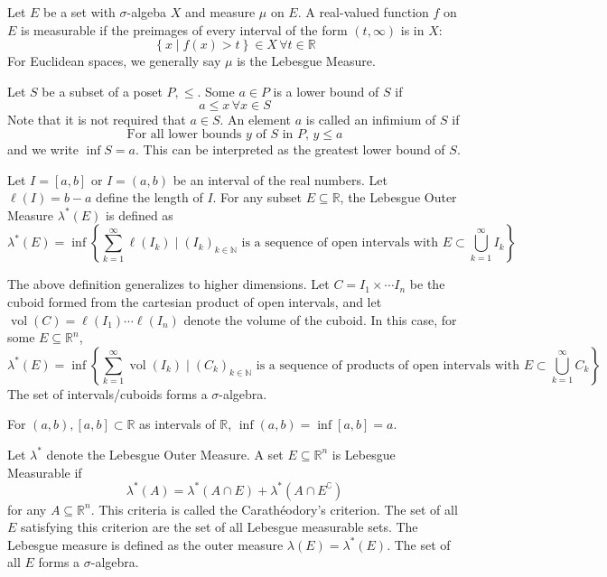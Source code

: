 \documentclass[12pt, letterpaper]{report}
\begin{document}
\begin{definition}
    Let \(E\) be a set with \(\sigma \)-algeba \(X\) and measure \(\mu \) on \(E\). A real-valued function \(f\) on \(E\) is measurable if the preimages of every interval of the form \((t,\infty)\) is in \(X\):
    \[
        \left\{ x \mid f(x)>t \right\} \in X\,\forall t\in\mathbb{R} 
    \]
    For Euclidean spaces, we generally say \(\mu \) is the Lebesgue Measure.
\end{definition}
\begin{definition}[Infimium]
    Let \(S\) be a subset of a poset \(P,\leq \). Some \(a\in P\) is a lower bound of \(S\) if
    \[
        a \leq x\,\forall x\in S
    \]
    Note that it is not required that \(a\in S\). An element \(a\) is called an infimium of \(S\) if
    \[
        \text{For all lower bounds } y\text{ of } S\text{ in } P,\, y\leq a
    \]
    and we write \(\inf S=a\). This can be interpreted as the greatest lower bound of \(S\).
\end{definition}	
\begin{definition}
    Let \(I=[a,b ]\) or \(I=(a,b)\) be an interval of the real numbers. Let \(\ell (I)=b-a\) define the length of \(I\). For any subset \(E \subseteq \mathbb{R} \), the Lebesgue Outer Measure \(\lambda^*(E)\) is defined as 
    \[
        \lambda^*(E)=\inf \left\{ \sum_{k=1}^\infty \ell \left( I_k \right) \mid \left( I_k \right)_{k\in\mathbb{N} }\text{ is a sequence of open intervals with }E\subset \bigcup_{k=1}^{\infty}I_k     \right\} 
    \]
\end{definition}
The above definition generalizes to higher dimensions. Let \(C=I_1 \times \cdots I_n\) be the cuboid formed from the cartesian product of open intervals, and let \(\operatorname{vol}(C)=\ell (I_1)\cdots \ell (I_n) \) denote the volume of the cuboid. In this case, for some \(E \subseteq \mathbb{R} ^n\),
\[
    \lambda^*(E)=\inf \left\{ \sum_{k=1}^\infty  \operatorname{vol}\left( I_k \right) \mid \left( C_k \right)_{k\in\mathbb{N} }\text{ is a sequence of products of open intervals with }E\subset \bigcup_{k=1}^{\infty}C_k     \right\} 
\]
The set of intervals/cuboids forms a \(\sigma \)-algebra.
\begin{remark}
    For \((a,b),[a,b]\subset \mathbb{R} \) as intervals of \(\mathbb{R} \), \(\inf (a,b)=\inf [a,b]=a\).
\end{remark}
\begin{definition}
    Let \(\lambda^*\) denote the Lebesgue Outer Measure. A set \(E \subseteq \mathbb{R}^n \) is Lebesgue Measurable if
    \[
        \lambda ^*(A) = \lambda ^*(A\cap E)+\lambda ^*\left(A\cap E^{\complement} \right)
    \]
    for any \(A \subseteq \mathbb{R} ^n\). This criteria is called the Carath\'eodory's criterion. The set of all \(E\) satisfying this criterion are the set of all Lebesgue measurable sets. The Lebesgue measure is defined as the outer measure \(\lambda (E)=\lambda ^*(E)\). The set of all \(E\) forms a \(\sigma \)-algebra.
\end{definition}
\end{document}
